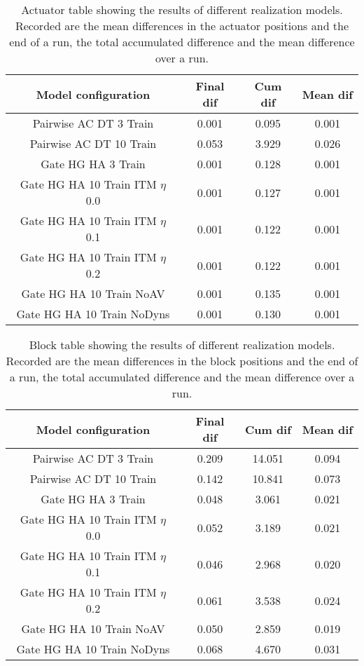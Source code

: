 \begin{table}
	\begin{tabular}{|c|c|c|c|}
		\hline Model configuration & Final dif & Cum dif & Mean dif \\ 
		\hline Pairwise AC DT 3 Train & 0.001 & 0.095 & 0.001  \\ 
		\hline Pairwise AC DT 10 Train & 0.053 & 3.929 & 0.026  \\ 
		\hline Gate HG HA 3 Train & 0.001 & 0.128 & 0.001 \\
		\hline Gate HG HA 10 Train ITM $\eta$ 0.0 & 0.001 & 0.127 & 0.001 \\ 
		\hline Gate HG HA 10 Train ITM $\eta$ 0.1 & 0.001 & 0.122 & 0.001 \\
		\hline Gate HG HA 10 Train ITM $\eta$ 0.2 & 0.001 & 0.122 & 0.001 \\ 
		\hline Gate HG HA 10 Train NoAV & 0.001 & 0.135 & 0.001 \\ 
		\hline Gate HG HA 10 Train NoDyns & 0.001 & 0.130 & 0.001 \\ 
		\hline 
	\end{tabular} 
	\caption{Actuator table showing the results of different realization models. Recorded are the mean differences in the actuator positions and the end of a run, the total accumulated difference and the mean difference over a run.}
\end{table}

\begin{table}
	\begin{tabular}{|c|c|c|c|}
		\hline Model configuration & Final dif & Cum dif & Mean dif \\ 
		\hline Pairwise AC DT 3 Train & 0.209 & 14.051 & 0.094  \\ 
		\hline Pairwise AC DT 10 Train & 0.142 & 10.841 & 0.073  \\
		\hline Gate HG HA 3 Train & 0.048 & 3.061 & 0.021 \\ 
		\hline Gate HG HA 10 Train ITM $\eta$ 0.0 & 0.052 & 3.189 & 0.021 \\ 
		\hline Gate HG HA 10 Train ITM $\eta$ 0.1 & 0.046 & 2.968 & 0.020 \\ 
		\hline Gate HG HA 10 Train ITM $\eta$ 0.2 & 0.061 & 3.538 & 0.024 \\ 
		\hline Gate HG HA 10 Train NoAV & 0.050 & 2.859 & 0.019 \\ 
		\hline Gate HG HA 10 Train NoDyns & 0.068 & 4.670 & 0.031 \\ 
		\hline 
	\end{tabular} 
	\caption{Block table showing the results of different realization models. Recorded are the mean differences in the block positions and the end of a run, the total accumulated difference and the mean difference over a run.}
\end{table}

